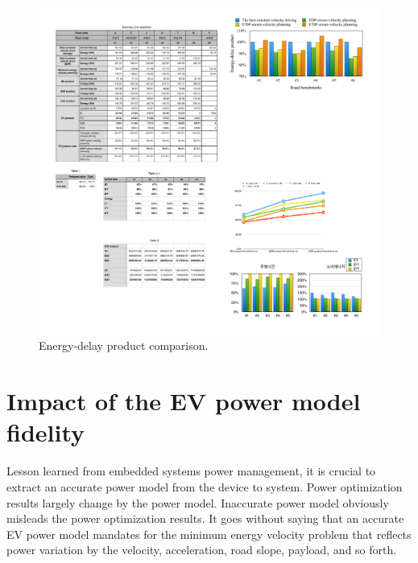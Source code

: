 \documentclass{IEEEtran}
\begin{document}
\begin{figure}	 %
\centering
\includegraphics[width=\hsize]{Figures/EDP_bar.pdf}
\caption{Energy-delay product comparison.}
\label{fig:EDP_bar}
\end{figure} 


\section{Impact of the EV power model fidelity} \label{sec:impact_EV_power model}

Lesson learned from embedded systems power management, it is crucial to extract an accurate power model from the device to system. Power optimization results largely change by the power model. Inaccurate power model obviously misleads the power optimization results. It goes without saying that an accurate EV power model mandates for the minimum energy velocity problem that reflects power variation by the velocity, acceleration, road slope, payload, and so forth.
\end{document}
